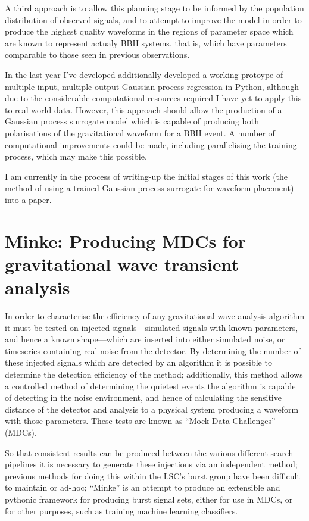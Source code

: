 \documentclass[openleft]{kentigern}
\theoremstyle{definition}
\begin{document}
A third approach is to allow this planning stage to be informed by the
population distribution of observed signals, and to attempt to improve
the model in order to produce the highest quality waveforms in the
regions of parameter space which are known to represent actualy BBH
systems, that is, which have parameters comparable to those seen in
previous observations.



In the last year I've developed additionally developed a working
protoype of multiple-input, multiple-output Gaussian process
regression in Python, although due to the considerable computational
resources required I have yet to apply this to real-world
data. However, this approach should allow the production of a Gaussian
process surrogate model which is capable of producing both
polarisations of the gravitational waveform for a BBH event. A number
of computational improvements could be made, including parallelising
the training process, which may make this possible.

I am currently in the process of writing-up the initial stages of this
work (the method of using a trained Gaussian process surrogate for
waveform placement) into a paper.

\section{Minke: Producing MDCs for gravitational wave transient analysis}
\label{sec:mink-prod-mdcs}

In order to characterise the efficiency of any gravitational wave
analysis algorithm it must be tested on injected signals---simulated
signals with known parameters, and hence a known shape---which are
inserted into either simulated noise, or timeseries containing real
noise from the detector. By determining the number of these injected
signals which are detected by an algorithm it is possible to determine
the detection efficiency of the method; additionally, this method
allows a controlled method of determining the quietest events the
algorithm is capable of detecting in the noise environment, and hence
of calculating the sensitive distance of the detector and analysis to
a physical system producing a waveform with those parameters. These
tests are known as ``Mock Data Challenges'' (MDCs).

So that consistent results can be produced between the various
different search pipelines it is necessary to generate these
injections via an independent method; previous methods for doing this
within the LSC's burst group have been difficult to maintain or
ad-hoc; ``Minke'' is an attempt to produce an extensible and pythonic
framework for producing burst signal sets, either for use in MDCs, or
for other purposes, such as training machine learning classifiers.
\end{document}
